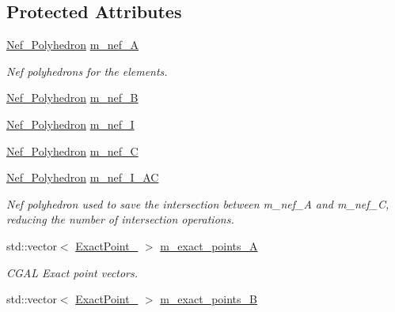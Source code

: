 \subsection*{Protected Attributes}
\begin{DoxyCompactItemize}
\item 
\hyperlink{_c_g_a_l__typedefs_8h_ab85d2fceadc71a761aa3a184793f8c5f}{Nef\+\_\+\+Polyhedron} \hyperlink{classcarl_1_1_intersection___tools_a66a33158af0779366d4109e96a10ddc4}{m\+\_\+nef\+\_\+\+A}
\begin{DoxyCompactList}\small\item\em Nef polyhedrons for the elements. \end{DoxyCompactList}\item 
\hyperlink{_c_g_a_l__typedefs_8h_ab85d2fceadc71a761aa3a184793f8c5f}{Nef\+\_\+\+Polyhedron} \hyperlink{classcarl_1_1_intersection___tools_a0b134a30452c8a767fc4265c7c0296a9}{m\+\_\+nef\+\_\+\+B}
\item 
\hyperlink{_c_g_a_l__typedefs_8h_ab85d2fceadc71a761aa3a184793f8c5f}{Nef\+\_\+\+Polyhedron} \hyperlink{classcarl_1_1_intersection___tools_a47353dc1c374f45bf3dbaae667270cf3}{m\+\_\+nef\+\_\+\+I}
\item 
\hyperlink{_c_g_a_l__typedefs_8h_ab85d2fceadc71a761aa3a184793f8c5f}{Nef\+\_\+\+Polyhedron} \hyperlink{classcarl_1_1_intersection___tools_adf2892a8902442fbfebb913e9a4fb8ac}{m\+\_\+nef\+\_\+\+C}
\item 
\hyperlink{_c_g_a_l__typedefs_8h_ab85d2fceadc71a761aa3a184793f8c5f}{Nef\+\_\+\+Polyhedron} \hyperlink{classcarl_1_1_intersection___tools_a8333f16787459e65c4fe913dad50b5c6}{m\+\_\+nef\+\_\+\+I\+\_\+\+A\+C}
\begin{DoxyCompactList}\small\item\em Nef polyhedron used to save the intersection between m\+\_\+nef\+\_\+\+A and m\+\_\+nef\+\_\+\+C, reducing the number of intersection operations. \end{DoxyCompactList}\item 
std\+::vector$<$ \hyperlink{_c_g_a_l__typedefs_8h_a162dbf669b38ca5632e00c9c02e000a5}{Exact\+Point\+\_} $>$ \hyperlink{classcarl_1_1_intersection___tools_ad636117b292272044b252be62124eb0a}{m\+\_\+exact\+\_\+points\+\_\+\+A}
\begin{DoxyCompactList}\small\item\em C\+G\+A\+L Exact point vectors. \end{DoxyCompactList}\item 
std\+::vector$<$ \hyperlink{_c_g_a_l__typedefs_8h_a162dbf669b38ca5632e00c9c02e000a5}{Exact\+Point\+\_} $>$ \hyperlink{classcarl_1_1_intersection___tools_a2c3b6211dd1f9b0aa5f2ac8ffc383182}{m\+\_\+exact\+\_\+points\+\_\+\+B}

\end{DoxyCompactItemize}

